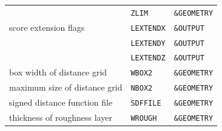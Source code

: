 \begin{center}
\begin{tabular}{lll}
                                  & \texttt{ZLIM}     & \texttt{\&GEOMETRY} \\
score extension flags             & \texttt{LEXTENDX} & \texttt{\&OUTPUT} \\
                                  & \texttt{LEXTENDY} & \texttt{\&OUTPUT} \\
                                  & \texttt{LEXTENDZ} & \texttt{\&OUTPUT} \\
box width of distance grid        & \texttt{WBOX2}    & \texttt{\&GEOMETRY} \\
maximum size of distance grid     & \texttt{NBOX2}    & \texttt{\&GEOMETRY} \\
signed distance function file     & \texttt{SDFFILE}  & \texttt{\&GEOMETRY} \\
thickness of roughness layer      & \texttt{WROUGH}   & \texttt{\&GEOMETRY} \\

\end{tabular}
\end{center}


